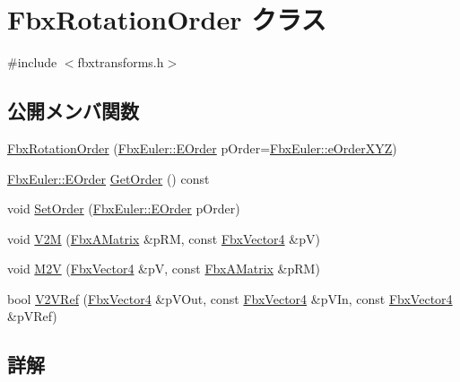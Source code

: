 \hypertarget{class_fbx_rotation_order}{}\section{Fbx\+Rotation\+Order クラス}
\label{class_fbx_rotation_order}


{\ttfamily \#include $<$fbxtransforms.\+h$>$}

\subsection*{公開メンバ関数}
\begin{DoxyCompactItemize}
\item 
\hyperlink{class_fbx_rotation_order_a564325d965730df56b242db19e54eebb}{Fbx\+Rotation\+Order} (\hyperlink{class_fbx_euler_a7d5bec7eedb022b4dae56894ab7a9939}{Fbx\+Euler\+::\+E\+Order} p\+Order=\hyperlink{class_fbx_euler_a7d5bec7eedb022b4dae56894ab7a9939a826dcd420b1fcf49fac1f5ebbbf16894}{Fbx\+Euler\+::e\+Order\+X\+YZ})
\item 
\hyperlink{class_fbx_euler_a7d5bec7eedb022b4dae56894ab7a9939}{Fbx\+Euler\+::\+E\+Order} \hyperlink{class_fbx_rotation_order_a7f846dc5e5676714d56698356917e77d}{Get\+Order} () const
\item 
void \hyperlink{class_fbx_rotation_order_ac6269a975333f6cdc9d34630d0afed79}{Set\+Order} (\hyperlink{class_fbx_euler_a7d5bec7eedb022b4dae56894ab7a9939}{Fbx\+Euler\+::\+E\+Order} p\+Order)
\item 
void \hyperlink{class_fbx_rotation_order_a51aaffe701607ad3ce75f153f8ff1965}{V2M} (\hyperlink{class_fbx_a_matrix}{Fbx\+A\+Matrix} \&p\+RM, const \hyperlink{class_fbx_vector4}{Fbx\+Vector4} \&pV)
\item 
void \hyperlink{class_fbx_rotation_order_af1f1258fdb975cc35fc38456d6f8ba7c}{M2V} (\hyperlink{class_fbx_vector4}{Fbx\+Vector4} \&pV, const \hyperlink{class_fbx_a_matrix}{Fbx\+A\+Matrix} \&p\+RM)
\item 
bool \hyperlink{class_fbx_rotation_order_ae06483cd7b2d959fd38c55135879a2cf}{V2\+V\+Ref} (\hyperlink{class_fbx_vector4}{Fbx\+Vector4} \&p\+V\+Out, const \hyperlink{class_fbx_vector4}{Fbx\+Vector4} \&p\+V\+In, const \hyperlink{class_fbx_vector4}{Fbx\+Vector4} \&p\+V\+Ref)
\end{DoxyCompactItemize}


\subsection{詳解}



